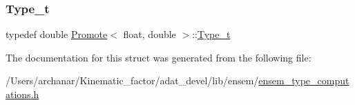 \subsubsection{\texorpdfstring{Type\_t}{Type\_t}\hspace{0.1cm}{\footnotesize\ttfamily [2/2]}}
{\footnotesize\ttfamily typedef double \mbox{\hyperlink{structPromote}{Promote}}$<$ float, double $>$\+::\mbox{\hyperlink{structPromote_3_01float_00_01double_01_4_a45975d2ae1225ef4f1993d0a48b8a58e}{Type\+\_\+t}}}



The documentation for this struct was generated from the following file\+:\begin{DoxyCompactItemize}
\item 
/\+Users/archanar/\+Kinematic\+\_\+factor/adat\+\_\+devel/lib/ensem/\mbox{\hyperlink{lib_2ensem_2ensem__type__computations_8h}{ensem\+\_\+type\+\_\+computations.\+h}}\end{DoxyCompactItemize}
